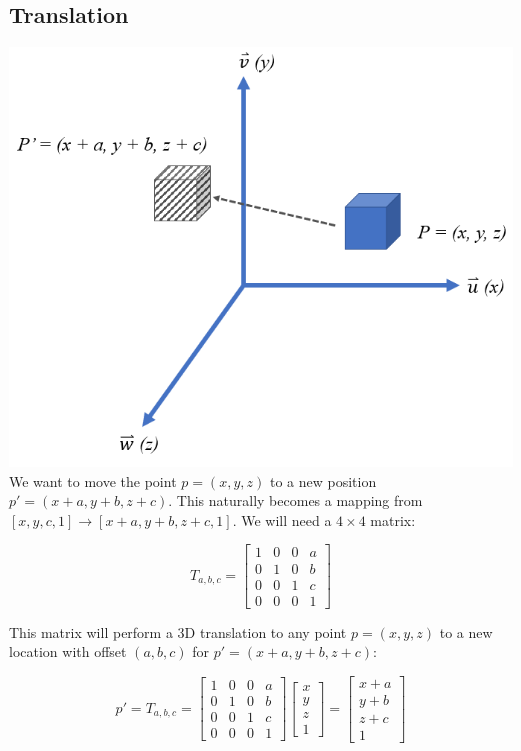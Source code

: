 \documentclass[12pt,letterpaper]{article}
\begin{document}
\subsection{Translation}
\includegraphics[scale=0.75]{translation}
We want to move the point $p = (x, y, z)$ to a new position $p' = (x+a, y+b, z+c)$. This naturally becomes a mapping from $[x, y, c, 1] \rightarrow [x+a, y+b, z+c, 1]$. We will need a $4 \times 4$ matrix:

\begin{equation}
    T_{a, b, c} = \begin{bmatrix}
        1 & 0 & 0 & a \\
        0 & 1 & 0 & b \\
        0 & 0 & 1 & c \\
        0 & 0 & 0 & 1
    \end{bmatrix}
\end{equation}

This matrix will perform a 3D translation to any point $p = (x, y, z)$ to a new location with offset $(a, b, c)$ for $p' = (x+a, y+b, z+c)$:

\begin{equation}
    p' = T_{a, b, c} = \begin{bmatrix}
        1 & 0 & 0 & a \\
        0 & 1 & 0 & b \\
        0 & 0 & 1 & c \\
        0 & 0 & 0 & 1
    \end{bmatrix}
    \begin{bmatrix}
        x \\
        y \\
        z \\
        1
    \end{bmatrix}
    = \begin{bmatrix}
        x+a \\
        y+b \\
        z+c \\
        1
    \end{bmatrix}
\end{equation}
\end{document}
